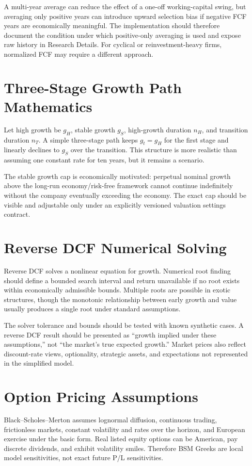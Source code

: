 \documentclass[11pt]{article}
\begin{document}
A multi-year average can reduce the effect of a one-off working-capital swing, but averaging only positive years can introduce upward selection bias if negative FCF years are economically meaningful. The implementation should therefore document the condition under which positive-only averaging is used and expose raw history in Research Details. For cyclical or reinvestment-heavy firms, normalized FCF may require a different approach.

\section{Three-Stage Growth Path Mathematics}
Let high growth be $g_H$, stable growth $g_S$, high-growth duration $n_H$, and transition duration $n_T$. A simple three-stage path keeps $g_t=g_H$ for the first stage and linearly declines to $g_S$ over the transition. This structure is more realistic than assuming one constant rate for ten years, but it remains a scenario.

The stable growth cap is economically motivated: perpetual nominal growth above the long-run economy/risk-free framework cannot continue indefinitely without the company eventually exceeding the economy. The exact cap should be visible and adjustable only under an explicitly versioned valuation settings contract.

\section{Reverse DCF Numerical Solving}
Reverse DCF solves a nonlinear equation for growth. Numerical root finding should define a bounded search interval and return unavailable if no root exists within economically admissible bounds. Multiple roots are possible in exotic structures, though the monotonic relationship between early growth and value usually produces a single root under standard assumptions.

The solver tolerance and bounds should be tested with known synthetic cases. A reverse DCF result should be presented as ``growth implied under these assumptions,'' not ``the market's true expected growth.'' Market prices also reflect discount-rate views, optionality, strategic assets, and expectations not represented in the simplified model.

\section{Option Pricing Assumptions}
Black--Scholes--Merton assumes lognormal diffusion, continuous trading, frictionless markets, constant volatility and rates over the horizon, and European exercise under the basic form. Real listed equity options can be American, pay discrete dividends, and exhibit volatility smiles. Therefore BSM Greeks are local model sensitivities, not exact future P/L sensitivities.
\end{document}
